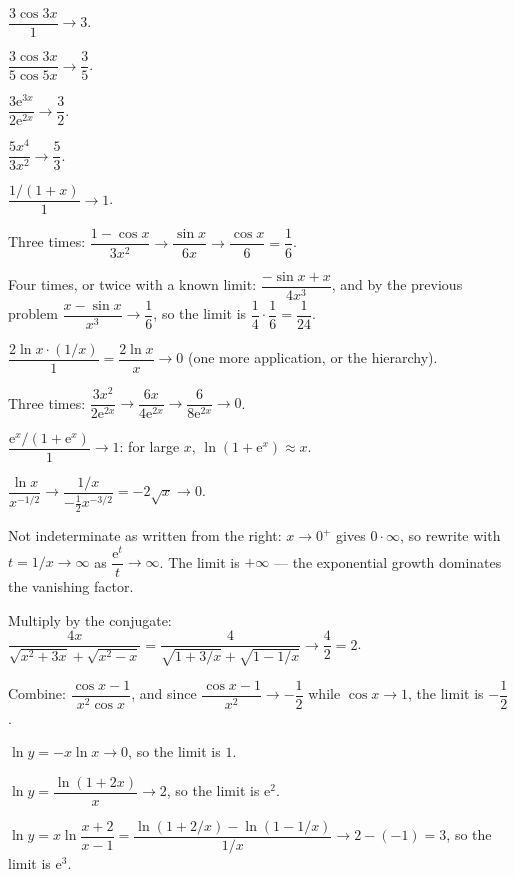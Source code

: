 \begin{solutions}
  \item $\dfrac{3\cos3x}{1}\to3$.
  \item $\dfrac{3\cos3x}{5\cos5x}\to\dfrac35$.
  \item $\dfrac{3\mathrm{e}^{3x}}{2\mathrm{e}^{2x}}\to\dfrac32$.
  \item $\dfrac{5x^{4}}{3x^{2}}\to\dfrac53$.
  \item $\dfrac{1/(1+x)}{1}\to1$.
  \item Three times:
        $\dfrac{1-\cos x}{3x^{2}}\to\dfrac{\sin x}{6x}\to
        \dfrac{\cos x}{6}=\dfrac16$.
  \item Four times, or twice with a known limit:
        $\dfrac{-\sin x+x}{4x^{3}}$, and by the previous problem
        $\dfrac{x-\sin x}{x^{3}}\to\dfrac16$, so the limit is
        $\dfrac{1}{4}\cdot\dfrac16=\dfrac{1}{24}$.
  \item $\dfrac{2\ln x\cdot(1/x)}{1}=\dfrac{2\ln x}{x}\to0$ (one more
        application, or the hierarchy).
  \item Three times:
        $\dfrac{3x^{2}}{2\mathrm{e}^{2x}}\to\dfrac{6x}{4\mathrm{e}^{2x}}
        \to\dfrac{6}{8\mathrm{e}^{2x}}\to0$.
  \item $\dfrac{\mathrm{e}^{x}/(1+\mathrm{e}^{x})}{1}\to1$: for large $x$,
        $\ln(1+\mathrm{e}^{x})\approx x$.
  \item $\dfrac{\ln x}{x^{-1/2}}\to\dfrac{1/x}{-\tfrac12x^{-3/2}}
        =-2\sqrt{x}\to0$.
  \item Not indeterminate as written from the right: $x\to0^{+}$ gives
        $0\cdot\infty$, so rewrite with $t=1/x\to\infty$ as
        $\dfrac{\mathrm{e}^{t}}{t}\to\infty$. The limit is $+\infty$ ---
        the exponential growth dominates the vanishing factor.
  \item Multiply by the conjugate:
        $\dfrac{4x}{\sqrt{x^{2}+3x}+\sqrt{x^{2}-x}}
        =\dfrac{4}{\sqrt{1+3/x}+\sqrt{1-1/x}}\to\dfrac{4}{2}=2$.
  \item Combine: $\dfrac{\cos x-1}{x^{2}\cos x}$, and since
        $\dfrac{\cos x-1}{x^{2}}\to-\dfrac12$ while $\cos x\to1$, the limit
        is $-\dfrac12$.
  \item $\ln y=-x\ln x\to0$, so the limit is $1$.
  \item $\ln y=\dfrac{\ln(1+2x)}{x}\to2$, so the limit is
        $\mathrm{e}^{2}$.
  \item $\ln y=x\ln\!\dfrac{x+2}{x-1}
        =\dfrac{\ln(1+2/x)-\ln(1-1/x)}{1/x}\to2-(-1)=3$, so the limit is
        $\mathrm{e}^{3}$.

\end{solutions}
